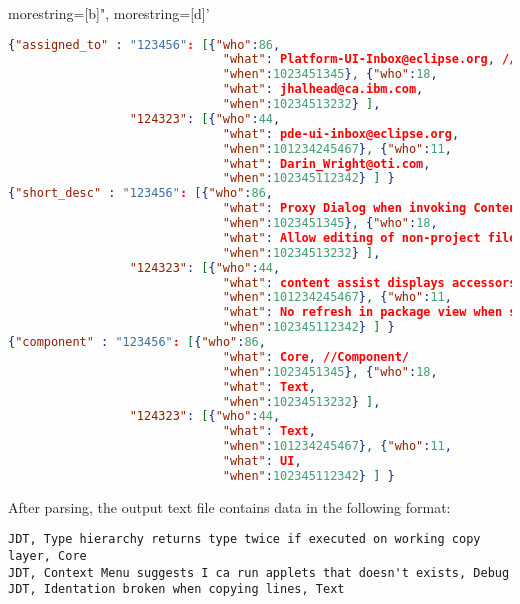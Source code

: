 {
	morestring=[b]",
	morestring=[d]'
}
\begin{lstlisting}[language=json,firstnumber=1]
{"assigned_to" : "123456": [{"who":86,
							  "what": Platform-UI-Inbox@eclipse.org, //developer/
							  "when":1023451345}, {"who":18,
							  "what": jhalhead@ca.ibm.com,
							  "when":10234513232} ],
				 "124323": [{"who":44,
							  "what": pde-ui-inbox@eclipse.org, 
							  "when":101234245467}, {"who":11,
							  "what": Darin_Wright@oti.com,
							  "when":102345112342} ] }			  
{"short_desc" : "123456": [{"who":86,
							  "what": Proxy Dialog when invoking Content Assist , //Short Description/
							  "when":1023451345}, {"who":18,
							  "what": Allow editing of non-project files,
							  "when":10234513232} ],
				 "124323": [{"who":44,
							  "what": content assist displays accessors, 
							  "when":101234245467}, {"who":11,
							  "what": No refresh in package view when switching internal JAR,
							  "when":102345112342} ] }
{"component" : "123456": [{"who":86,
							  "what": Core, //Component/
							  "when":1023451345}, {"who":18,
							  "what": Text,
							  "when":10234513232} ],
				 "124323": [{"who":44,
							  "what": Text, 
							  "when":101234245467}, {"who":11,
							  "what": UI,
							  "when":102345112342} ] }							  
\end{lstlisting}
After parsing, the output text file contains data in the following format:
\begin{verbatim}
JDT, Type hierarchy returns type twice if executed on working copy layer, Core
JDT, Context Menu suggests I ca run applets that doesn't exists, Debug
JDT, Identation broken when copying lines, Text
\end{verbatim}